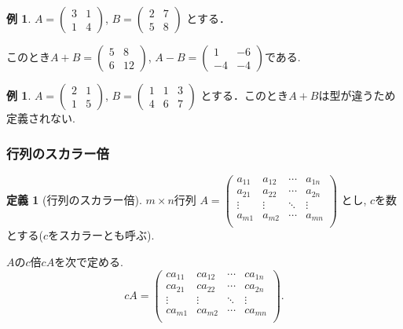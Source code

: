 \documentclass[dvipdfmx,a4paper,11pt]{article} %
\theoremstyle{definition}
\newtheorem{dfn}[thm]{定義}
\newtheorem{exa}[thm]{例}
\begin{document}
\begin{exa}
 $A = 
 \begin{pmatrix}
 3&1 \\
 1&4
 \end{pmatrix}
 $, 
 $
 B = 
 \begin{pmatrix}
 2&7\\
 5&8
 \end{pmatrix}
 $
 とする．
 
 このとき$
 A+B =
 \begin{pmatrix}
 5&8 \\
6&12
 \end{pmatrix}
 $, 
 $
  A-B =
 \begin{pmatrix}
 1&-6 \\
 -4&-4
 \end{pmatrix}
 $である.
 \end{exa}
 
 \begin{exa}
 $A = 
 \begin{pmatrix}
 2&1 \\
 1&5
 \end{pmatrix}
 $,
$ 
 B = 
 \begin{pmatrix}
 1&1 &3 \\
 4&6 & 7
 \end{pmatrix}
 $
 とする．このとき$A+B$は型が違うため定義されない. 
 \end{exa}
 
 

 \subsubsection{行列のスカラー倍}


    \begin{dfn}[行列のスカラー倍]
    \text{}
    
 $m \times n$行列
 $
A=\begin{pmatrix}
a_{11}& a_{12} & \cdots &a_{1n} \\
a_{21}& a_{22} & \cdots &a_{2n} \\
\vdots& \vdots	&	\ddots   &	\vdots \\
a_{m1}& a_{m2} & \cdots &a_{mn} \\
\end{pmatrix}$
とし, $c$を数とする($c$をスカラーとも呼ぶ).

$A$の$c$倍$cA$を次で定める.
$$
cA=
\begin{pmatrix}
ca_{11}&c a_{12} & \cdots &ca_{1n} \\
ca_{21}& ca_{22} & \cdots &ca_{2n} \\
\vdots& \vdots	&	\ddots   &	\vdots \\
ca_{m1}& ca_{m2} & \cdots &ca_{mn} \\
\end{pmatrix}.
$$
  \end{dfn}
\end{document}
